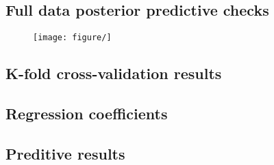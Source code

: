 \documentclass[12pt,letterpaper]{article}
\begin{document}
\subsection{Full data posterior predictive checks}
\begin{figure}[ht]
  \centering
  \texttt{[image: figure/]}
  \caption{}
  \label{fig:}
\end{figure}


\subsection{K-fold cross-validation results}


\subsection{Regression coefficients}


\subsection{Preditive results}
\end{document}
